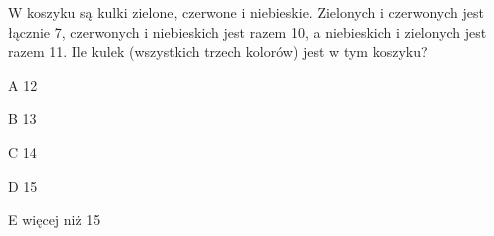 \begin{tresc}
W koszyku są kulki zielone, czerwone i niebieskie. Zielonych i czerwonych jest łącznie 7, czerwonych i niebieskich jest razem 10, a niebieskich i zielonych jest razem 11. Ile kulek (wszystkich trzech kolorów) jest w tym koszyku?
\end{tresc}
\begin{wariant}{A} 12 \end{wariant}
\begin{wariant}{B} 13 \end{wariant}
\begin{wariant}{C} 14 \end{wariant}
\begin{wariant}{D} 15 \end{wariant}
\begin{wariant}{E} więcej niż 15 \end{wariant}
